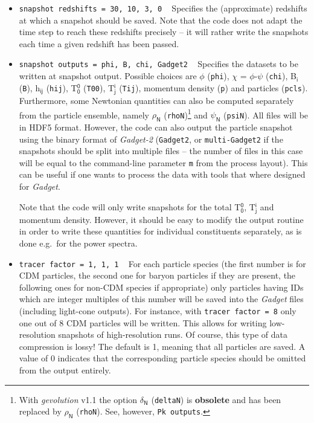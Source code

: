 \documentclass[a4paper,10pt]{article}
\begin{document}
\begin{itemize}
 \item[] \hspace{-25pt}\texttt{snapshot redshifts  = 30, 10, 3, 0} ~ Specifies the (approximate) redshifts at which a snapshot should be
 saved. Note that the code does not adapt the time step to reach these redshifts precisely -- it will rather write the snapshots each time a
 given redshift has been passed.
 \item[] \hspace{-25pt}\texttt{snapshot outputs = phi, B, chi, Gadget2} ~ Specifies the datasets to be written at snapshot output. Possible
 choices are $\mathsf{\phi}$ (\texttt{phi}), $\mathsf{\chi}$ = $\mathsf{\phi}$-$\mathsf{\psi}$ (\texttt{chi}), B$_\mathsf{i}$ (\texttt{B}),
 h$_\mathsf{ij}$ (\texttt{hij}), T$^\mathsf{0}_\mathsf{0}$ (\texttt{T00}), T$^\mathsf{i}_\mathsf{j}$ (\texttt{Tij}), momentum density
 (\texttt{p}) and particles (\texttt{pcls}). Furthermore, some Newtonian quantities can also be computed separately from the particle
 ensemble, namely $\mathsf{\rho}_\mathsf{N}$ (\texttt{rhoN})\footnote{With \textit{gevolution} v1.1 the option  $\mathsf{\delta}_\mathsf{N}$
 (\texttt{deltaN}) is \textbf{obsolete} and has been replaced by $\mathsf{\rho}_\mathsf{N}$ (\texttt{rhoN}). See, however, \texttt{Pk
 outputs}.} and $\mathsf{\psi}_\mathsf{N}$ (\texttt{psiN}). All files will be in HDF5 format. However, the code can also output the particle
 snapshot using the binary format of \textit{Gadget-2} (\texttt{Gadget2}, or \texttt{multi-Gadget2} if the snapshots should be split into multiple
 files -- the number of files in this case will be equal to the command-line parameter \texttt{m} from the process layout). This can be useful if one 
wants to process the data with tools that where designed for \textit{Gadget}.
 
 Note that the code will only write snapshots for the total T$^\mathsf{0}_\mathsf{0}$, T$^\mathsf{i}_\mathsf{j}$ and momentum density. However, it should be easy to modify the output routine in order to write these quantities for individual constituents separately, as is done e.g.\ for the power spectra.
 \item[] \hspace{-25pt}\texttt{tracer factor = 1, 1, 1} ~ For each particle species (the first number is for CDM particles, the second one for baryon particles if they are present, the following ones for non-CDM species if appropriate) only particles having IDs which are integer multiples of this number will be saved into the \textit{Gadget} files (including light-cone outputs). For instance, with \texttt{tracer factor = 8} only one out of 8 CDM particles will be written. This allows for writing low-resolution snapshots of high-resolution runs. Of course, this type of data compression is lossy! The default is 1, meaning that all particles are saved. A value of 0 indicates that
 the corresponding particle species should be omitted from the output entirely.
 

\end{itemize}
\end{document}
